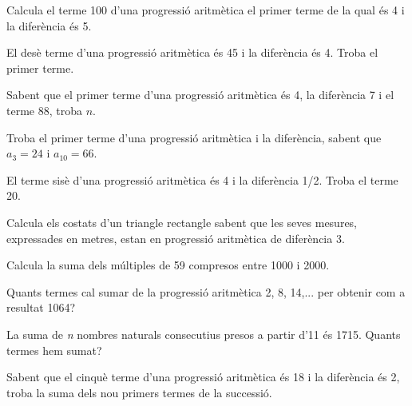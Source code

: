 \begin{activitats}
	
\begin{mylist}
\exer  Calcula el terme 100 d'una progressió aritmètica el primer terme de la qual és 4 i la diferència és 5. 
 
\exer  El desè terme d'una progressió aritmètica és 45 i la diferència és 4. Troba el primer terme. 
 
\exer  Sabent que el primer terme d'una progressió aritmètica és 4, la diferència 7 i el terme 88, troba $n$. 

\exer  Troba el primer terme d'una progressió aritmètica i la diferència, sabent que $a_{3} = 24$ i $a_{10} = 66$. 

\exer  El terme sisè d'una progressió aritmètica és 4 i la diferència 1/2. Troba el terme 20. 

\exer \hot Calcula els costats d'un triangle rectangle sabent que les seves mesures, expressades en metres, estan en progressió aritmètica de diferència 3. 

\exer  Calcula la suma dels múltiples de 59 compresos entre 1000 i 2000. 

\exer  Quants termes cal sumar de la progressió aritmètica 2, 8, 14,... per obtenir com a resultat 1064? 

\exer \hot La suma de \textit{n} nombres naturals consecutius presos a partir d'11 és 1715. Quants termes hem sumat? 

\exer  Sabent que el cinquè terme d'una progressió aritmètica és 18 i la diferència és 2, troba la suma dels nou primers termes de la successió. 


\end{mylist}
\end{activitats}
